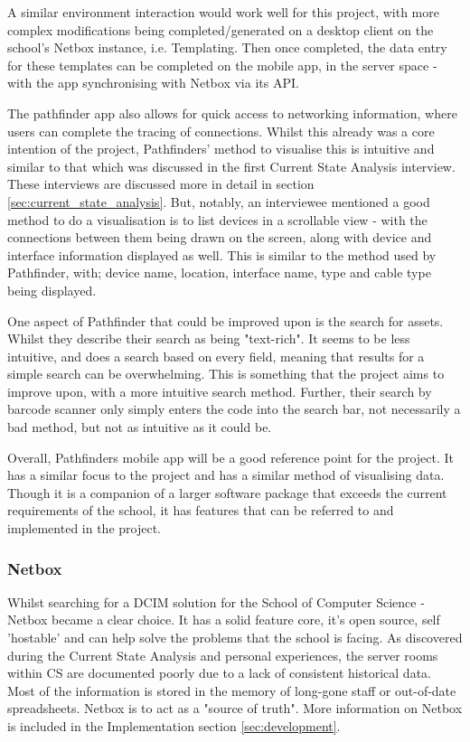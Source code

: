 \documentclass [11pt,a4paper]{article}
\begin{document}
A similar environment interaction would work well for this project, with more complex modifications being completed/generated on a desktop client on the school's Netbox instance, i.e. Templating. Then once completed, the data entry for these templates can be completed on the mobile app, in the server space - with the app synchronising with Netbox via its API. 

The pathfinder app also allows for quick access to networking information, where users can complete the tracing of connections. Whilst this already was a core intention of the project, Pathfinders' method to visualise this is intuitive and similar to that which was discussed in the first Current State Analysis interview. These interviews are discussed more in detail in section \ref{sec:current_state_analysis}. But, notably, an interviewee mentioned a good method to do a visualisation is to list devices in a scrollable view - with the connections between them being drawn on the screen, along with device and interface information displayed as well. This is similar to the method used by Pathfinder, with; device name, location, interface name, type and cable type being displayed. 

One aspect of Pathfinder that could be improved upon is the search for assets. Whilst they describe their search as being "text-rich". It seems to be less intuitive, and does a search based on every field, meaning that results for a simple search can be overwhelming. This is something that the project aims to improve upon, with a more intuitive search method. Further, their search by barcode scanner only simply enters the code into the search bar, not necessarily a bad method, but not as intuitive as it could be. 

Overall, Pathfinders mobile app will be a good reference point for the project. It has a similar focus to the project and has a similar method of visualising data. Though it is a companion of a larger software package that exceeds the current requirements of the school, it has features that can be referred to and implemented in the project.

\subsubsection{Netbox}
\label{sec:netbox}
Whilst searching for a DCIM solution for the School of Computer Science - Netbox became a clear choice. It has a solid feature core, it's open source, self 'hostable' and can help solve the problems that the school is facing. As discovered during the Current State Analysis and personal experiences, the server rooms within CS are documented poorly due to a lack of consistent historical data. Most of the information is stored in the memory of long-gone staff or out-of-date spreadsheets. Netbox is to act as a "source of truth"\cite{Netbox}. More information on Netbox is included in the Implementation section \ref{sec:development}. 
\end{document}
